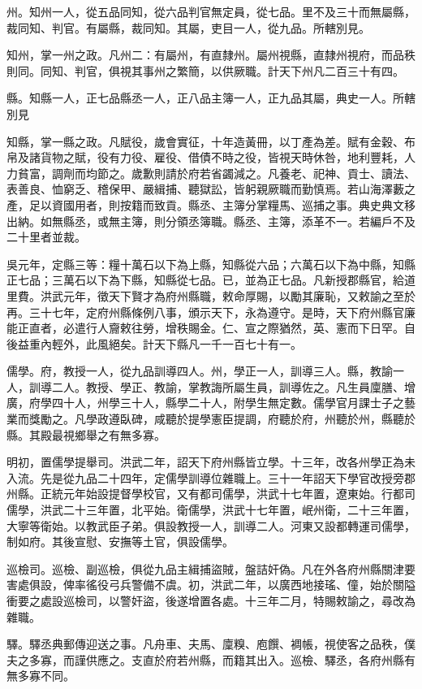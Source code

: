 州。知州一人，從五品同知，從六品判官無定員，從七品。里不及三十而無屬縣，裁同知、判官。有屬縣，裁同知。其屬，吏目一人，從九品。所轄別見。

知州，掌一州之政。凡州二：有屬州，有直隸州。屬州視縣，直隸州視府，而品秩則同。同知、判官，俱視其事州之繁簡，以供厥職。計天下州凡二百三十有四。

縣。知縣一人，正七品縣丞一人，正八品主簿一人，正九品其屬，典史一人。所轄別見

知縣，掌一縣之政。凡賦役，歲會實征，十年造黃冊，以丁產為差。賦有金穀、布帛及諸貨物之賦，役有力役、雇役、借債不時之役，皆視天時休咎，地利豐耗，人力貧富，調劑而均節之。歲歉則請於府若省蠲減之。凡養老、祀神、貢士、讀法、表善良、恤窮乏、稽保甲、嚴緝捕、聽獄訟，皆躬親厥職而勤慎焉。若山海澤藪之產，足以資國用者，則按籍而致貢。縣丞、主簿分掌糧馬、巡捕之事。典史典文移出納。如無縣丞，或無主簿，則分領丞簿職。縣丞、主簿，添革不一。若編戶不及二十里者並裁。

吳元年，定縣三等：糧十萬石以下為上縣，知縣從六品；六萬石以下為中縣，知縣正七品；三萬石以下為下縣，知縣從七品。已，並為正七品。凡新授郡縣官，給道里費。洪武元年，徵天下賢才為府州縣職，敕命厚賜，以勵其廉恥，又敕諭之至於再。三十七年，定府州縣條例八事，頒示天下，永為遵守。是時，天下府州縣官廉能正直者，必遣行人齎敕往勞，增秩賜金。仁、宣之際猶然，英、憲而下日罕。自後益重內輕外，此風絕矣。計天下縣凡一千一百七十有一。

儒學。府，教授一人，從九品訓導四人。州，學正一人，訓導三人。縣，教諭一人，訓導二人。教授、學正、教諭，掌教誨所屬生員，訓導佐之。凡生員廩膳、增廣，府學四十人，州學三十人，縣學二十人，附學生無定數。儒學官月課士子之藝業而獎勵之。凡學政遵臥碑，咸聽於提學憲臣提調，府聽於府，州聽於州，縣聽於縣。其殿最視鄉舉之有無多寡。

明初，置儒學提舉司。洪武二年，詔天下府州縣皆立學。十三年，改各州學正為未入流。先是從九品二十四年，定儒學訓導位雜職上。三十一年詔天下學官改授旁郡州縣。正統元年始設提督學校官，又有都司儒學，洪武十七年置，遼東始。行都司儒學，洪武二十三年置，北平始。衛儒學，洪武十七年置，岷州衛，二十三年置，大寧等衛始。以教武臣子弟。俱設教授一人，訓導二人。河東又設都轉運司儒學，制如府。其後宣慰、安撫等土官，俱設儒學。

巡檢司。巡檢、副巡檢，俱從九品主緝捕盜賊，盤詰奸偽。凡在外各府州縣關津要害處俱設，俾率徭役弓兵警備不虞。初，洪武二年，以廣西地接瑤、僮，始於關隘衝要之處設巡檢司，以警奸盜，後遂增置各處。十三年二月，特賜敕諭之，尋改為雜職。

驛。驛丞典郵傳迎送之事。凡舟車、夫馬、廩糗、庖饌、裯帳，視使客之品秩，僕夫之多寡，而謹供應之。支直於府若州縣，而籍其出入。巡檢、驛丞，各府州縣有無多寡不同。

